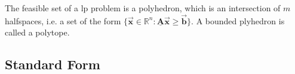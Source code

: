 \documentclass[9pt, headings=standardclasses, parskip=half]{scrartcl}
\renewcommand{\emph}[1]{\textcolor{mypurple}{#1}}
\newcommand{\matr}[1]{\underline{\boldsymbol{#1}}}
\newcommand{\vect}[1]{\vec{\boldsymbol{#1}}}
\newcommand{\R}{\mathbb{R}}
\begin{document}
The feasible set of a \gls{lp} problem is a \emph{polyhedron}, which is an intersection of \(m\) halfspaces, i.e. a set of the form \(\{ \vect{x} \in \R^{n} : \matr{A} \vect{x} \geq \vect{b} \}\).
A bounded plyhedron is called a \emph{polytope}.

\subsection{Standard Form}\label{sec:standardform_linear_programming}























\end{document}
